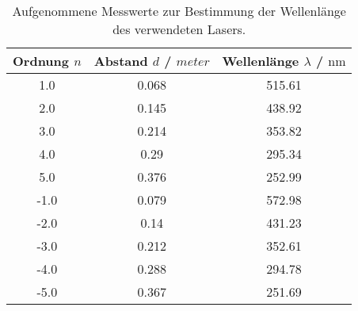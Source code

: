 \begin{table}
\centering
\caption{Aufgenommene Messwerte zur Bestimmung der Wellenlänge des verwendeten Lasers.}

\begin{tabular}{ccc}
\toprule
Ordnung $n$ & Abstand $d$ / $\si{meter}$ & Wellenlänge $\lambda$ / $\si{\nano\meter}$ \\
\midrule
1.0 & 0.068 & 515.61 \\
2.0 & 0.145 & 438.92 \\
3.0 & 0.214 & 353.82 \\
4.0 & 0.29 & 295.34 \\
5.0 & 0.376 & 252.99 \\
-1.0 & 0.079 & 572.98 \\
-2.0 & 0.14 & 431.23 \\
-3.0 & 0.212 & 352.61 \\
-4.0 & 0.288 & 294.78 \\
-5.0 & 0.367 & 251.69 \\
\bottomrule
\end{tabular}
\label{tab:welle}
\end{table}
